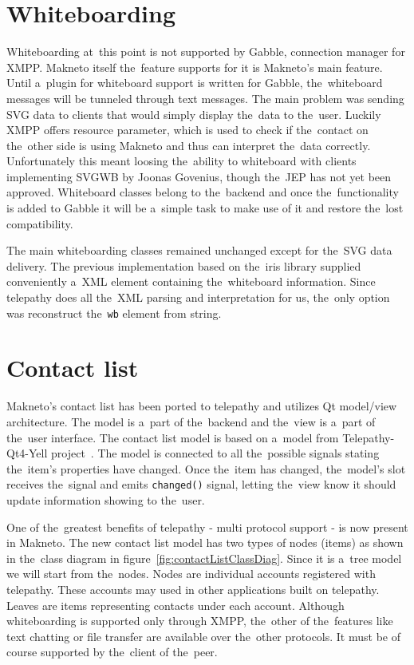 \section{Whiteboarding}
Whiteboarding at~this point is not supported by Gabble, connection manager for XMPP. Makneto itself the~feature supports for it is Makneto's main feature. Until a~plugin for whiteboard support is written for Gabble, the~whiteboard messages will be tunneled through text messages. The main problem was sending SVG data to clients that would simply display the~data to the~user. Luckily XMPP offers resource parameter, which is used to check if the~contact on the~other side is using Makneto and thus can interpret the~data correctly. Unfortunately this meant loosing the~ability to whiteboard with clients implementing SVGWB by Joonas Govenius, though the~JEP has not yet been approved. Whiteboard classes belong to the~backend and once the~functionality is added to Gabble it will be a~simple task to make use of it and restore the~lost compatibility. 

The main whiteboarding classes remained unchanged except for the~SVG data delivery. The previous implementation based on the~iris library supplied conveniently a~XML element containing the~whiteboard information. Since telepathy does all the~XML parsing and interpretation for us, the~only option was reconstruct the~\verb|wb| element from string.  

\section{Contact list}\label{section:contactList}
Makneto's contact list has been ported to telepathy and utilizes Qt model/view architecture. The model is a~part of the~backend and the~view is a~part of the~user interface. The contact list model is based on a~model from Telepathy-Qt4-Yell project~\cite{telepathyQt4Yell}. The model is connected to all the~possible signals stating the~item's properties have changed. Once the~item has changed, the~model's slot receives the~signal and emits \verb|changed()| signal, letting the~view know it should update information showing to the~user.   

One of the~greatest benefits of telepathy - multi protocol support - is now present in Makneto. The new contact list model has two types of nodes (items) as shown in the~class diagram in figure~\ref{fig:contactListClassDiag}. Since it is a~tree model we will start from the~nodes. Nodes are individual accounts registered with telepathy. These accounts may used in other applications built on telepathy. Leaves are items representing contacts under each account. Although whiteboarding is supported only through XMPP, the~other of the~features like text chatting or file transfer are available over the~other protocols. It must be of course supported by the~client of the~peer.

